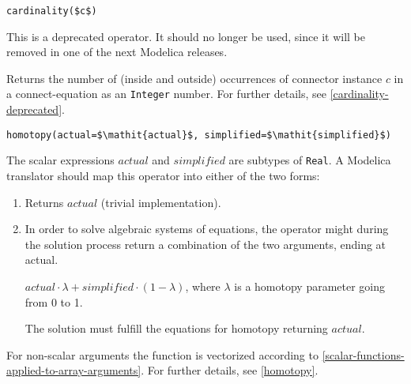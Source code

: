 \begin{operatordefinition}[cardinality]
\begin{synopsis}\begin{lstlisting}
cardinality($c$)
\end{lstlisting}\end{synopsis}
\begin{semantics}
\begin{nonnormative}
This is a deprecated operator.  It should no longer be used, since it will be removed in one of the next Modelica releases.
\end{nonnormative}
Returns the number of (inside and outside) occurrences of connector instance $c$ in a connect-equation as an \lstinline!Integer! number.  For further details, see \cref{cardinality-deprecated}.
\end{semantics}
\end{operatordefinition}

\begin{operatordefinition}[homotopy]
\begin{synopsis}\begin{lstlisting}
homotopy(actual=$\mathit{actual}$, simplified=$\mathit{simplified}$)
\end{lstlisting}\end{synopsis}
\begin{semantics}
The scalar expressions $\mathit{actual}$ and $\mathit{simplified}$ are subtypes of \lstinline!Real!.  A Modelica translator should map this operator into either of the two forms:
\begin{enumerate}
\item
  Returns $\mathit{actual}$ (trivial implementation).
\item
  In order to solve algebraic systems of equations, the operator might during the solution process return a combination of the two arguments, ending at actual.
  \begin{example}
  $\mathit{actual} \cdot \lambda + \mathit{simplified} \cdot (1 - \lambda)$, where $\lambda$ is a homotopy parameter going from 0 to 1.
  \end{example}
  The solution must fulfill the equations for homotopy returning $\mathit{actual}$.
\end{enumerate}
For non-scalar arguments the function is vectorized according to \cref{scalar-functions-applied-to-array-arguments}.  For further details, see \cref{homotopy}.
\end{semantics}
\end{operatordefinition}

